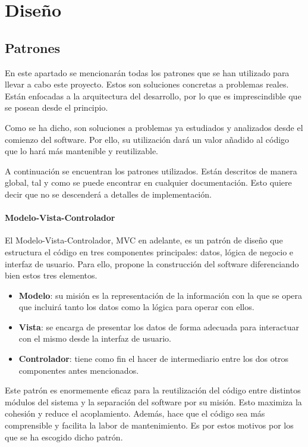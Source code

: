 
\chapter{Diseño}\label{diseno}
\section{Patrones}\label{sec:patrones}

En este apartado se mencionarán todas los patrones que se han utilizado para llevar a cabo este proyecto. Estos son soluciones concretas a problemas reales. Están enfocadas a la arquitectura del desarrollo, por lo que es imprescindible que se posean desde el principio.

Como se ha dicho, son soluciones a problemas ya estudiados y analizados desde el comienzo del software. Por ello, su utilización dará un valor añadido al código que lo hará más mantenible y reutilizable.

A continuación se encuentran los patrones utilizados. Están descritos de manera global, tal y como se puede encontrar en cualquier documentación. Esto quiere decir que no se descenderá a detalles de implementación.

\subsubsection{Modelo-Vista-Controlador}
El Modelo-Vista-Controlador, MVC en adelante, es un patrón de diseño que estructura el código en tres componentes principales: datos, lógica de negocio e interfaz de usuario. Para ello, propone la construcción del software diferenciando bien estos tres elementos.

\begin{itemize}
    \item \textbf{Modelo}: su misión es la representación de la información con la que se opera que incluirá tanto los datos como la lógica para operar con ellos.
    \item \textbf{Vista}: se encarga de presentar los datos de forma adecuada para interactuar con el mismo desde la interfaz de usuario.
    \item \textbf{Controlador}: tiene como fin el hacer de intermediario entre los dos otros componentes antes mencionados.
\end{itemize}

Este patrón es enormemente eficaz para la reutilización del código entre distintos módulos del sistema y la separación del software por su misión. Esto maximiza la cohesión y reduce el acoplamiento. Además, hace que el código sea más comprensible y facilita la labor de mantenimiento. Es por estos motivos por los que se ha escogido dicho patrón.

